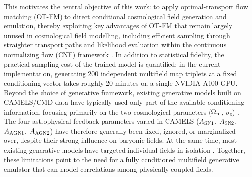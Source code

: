 \documentclass[usenatbib]{mnras}
\newcommand{\Om}{\Omega_{\rm m}}
\newcommand{\sig}{\sigma_8}
\begin{document}
This motivates the central objective of this work: to apply optimal-transport flow
matching (OT-FM) to direct conditional cosmological field generation
and emulation, thereby exploiting key advantages of OT-FM that remain
largely unused in cosmological field modelling, including efficient
sampling through straighter transport paths and likelihood evaluation
within the continuous normalizing flow (CNF) framework \citep{Chen2018}.
In addition to statistical fidelity, the practical sampling cost of the
trained model is quantified: in the current implementation, generating
200 independent multifield map triplets at a fixed conditioning vector
takes roughly 20 minutes on a single NVIDIA A100 GPU.
Beyond the choice of generative framework, existing generative models
built on CAMELS/CMD data have typically used only part of the available
conditioning information, focusing primarily on the two cosmological
parameters ($\Om$, $\sig$)
\citep{Andrianomena2022,Andrianomena2024,Mudur2022DDPM,Hassan2023HIDM,Mudur2024,Mudur2024DiffHMC}.
The four astrophysical feedback parameters varied in CAMELS
($A_{\rm SN1}$, $A_{\rm SN2}$, $A_{\rm AGN1}$, $A_{\rm AGN2}$) have
therefore generally been fixed, ignored, or marginalized over, despite
their strong influence on baryonic fields. At the same time, most
existing generative models have targeted individual fields in isolation
\citep{Hassan2021HIFlow,Mudur2022DDPM,Hassan2023HIDM,Mudur2024}.
Together, these limitations point to the need for a fully conditioned
multifield generative emulator that can model correlations among
physically coupled fields.
\end{document}
